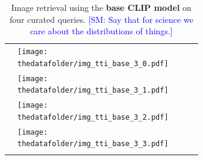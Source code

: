 \documentclass[10pt]{article} %
\newcommand{\SM}[1]{\textcolor{blue}{[SM: #1]}}
\begin{document}
\begin{table}[h!]
\begin{tabular}{m{3cm} p{3cm} p{3cm} p{3cm} p{3cm}}
      \midrule
      \texttt{} \vspace{20mm} & \centering \texttt{[image: \\thedatafolder/img\_tti\_base\_3\_0.pdf]} \\  & \centering \texttt{[image: \\thedatafolder/img\_tti\_base\_3\_1.pdf]} \\  & \centering \texttt{[image: \\thedatafolder/img\_tti\_base\_3\_2.pdf]} \\  & \centering \texttt{[image: \\thedatafolder/img\_tti\_base\_3\_3.pdf]} \\   \tabularnewline
      \bottomrule
  \end{tabular}
  \caption{Image retrieval using the \textbf{\textcolor{deeppurple}{base CLIP model}} on four curated queries. \SM{Say that for science we care about the distributions of things.}}
  \label{tab:tti_base}
\end{table}


\end{document}
